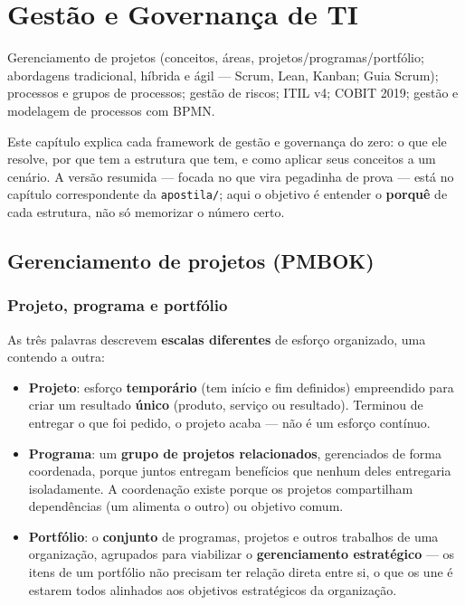 \chapter{Gestão e Governança de TI}
\label{cap:governanca-teoria}

\begin{edital}
Gerenciamento de projetos (conceitos, áreas, projetos/programas/portfólio;
abordagens tradicional, híbrida e ágil --- Scrum, Lean, Kanban; Guia Scrum);
processos e grupos de processos; gestão de riscos; ITIL v4; COBIT 2019;
gestão e modelagem de processos com BPMN.
\end{edital}

Este capítulo explica cada framework de gestão e governança do zero: o que
ele resolve, por que tem a estrutura que tem, e como aplicar seus conceitos a
um cenário. A versão resumida --- focada no que vira pegadinha de prova ---
está no capítulo correspondente da \texttt{apostila/}; aqui o objetivo é
entender o \textbf{porquê} de cada estrutura, não só memorizar o número certo.

\section{Gerenciamento de projetos (PMBOK)}

\subsection{Projeto, programa e portfólio}

\begin{conceito}
As três palavras descrevem \textbf{escalas diferentes} de esforço
organizado, uma contendo a outra:

\begin{itemize}
\item \textbf{Projeto}: esforço \textbf{temporário} (tem início e fim
definidos) empreendido para criar um resultado \textbf{único} (produto,
serviço ou resultado). Terminou de entregar o que foi pedido, o projeto
acaba --- não é um esforço contínuo.
\item \textbf{Programa}: um \textbf{grupo de projetos relacionados},
gerenciados de forma coordenada, porque juntos entregam benefícios que
nenhum deles entregaria isoladamente. A coordenação existe porque os
projetos compartilham dependências (um alimenta o outro) ou objetivo comum.
\item \textbf{Portfólio}: o \textbf{conjunto} de programas, projetos e
outros trabalhos de uma organização, agrupados para viabilizar o
\textbf{gerenciamento estratégico} --- os itens de um portfólio não
precisam ter relação direta entre si, o que os une é estarem todos
alinhados aos objetivos estratégicos da organização.
\end{itemize}
\end{conceito}

